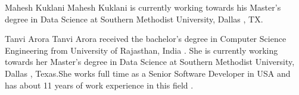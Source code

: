 \documentclass[journal]{hybrid-cloud}
\begin{document}
%
%
%














% 


\begin{IEEEbiographynophoto}{Mahesh Kuklani}
Mahesh Kuklani is currently working towards his Master's degree in Data Science at Southern Methodist University, Dallas , TX.
\end{IEEEbiographynophoto}


\begin{IEEEbiographynophoto}{Tanvi Arora}
Tanvi Arora received the bachelor's degree in Computer Science Engineering from University of Rajasthan, India . She is currently working towards her Master's degree in Data Science at Southern Methodist University, Dallas , Texas.She works full time as a Senior Software Developer in USA and has about 11 years of work experience in this field .
\end{IEEEbiographynophoto}






\end{document}
